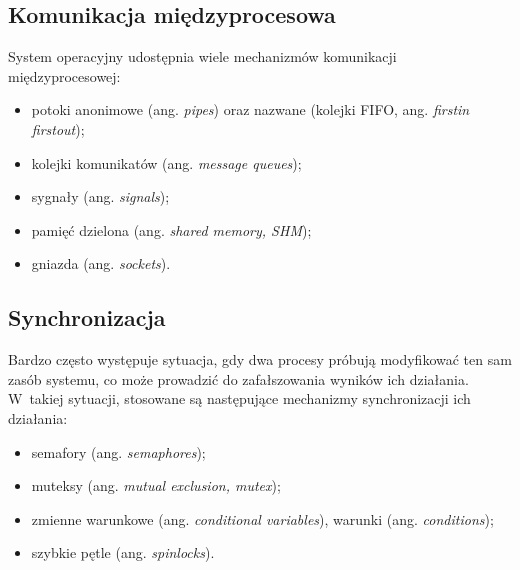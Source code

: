 \documentclass[11pt,makeidx]{mwart}
\begin{document}

\subsection{Komunikacja międzyprocesowa}
%
\indent
	System operacyjny udostępnia wiele mechanizmów komunikacji międzyprocesowej:
	\begin{itemize}
		\item potoki anonimowe (ang. \emph{pipes}) oraz nazwane (kolejki FIFO, ang. \emph{first\dywiz in first\dywiz out});
		\item kolejki komunikatów (ang. \emph{message queues});
		\item sygnały (ang. \emph{signals});
		\item pamięć dzielona (ang. \emph{shared memory, SHM});
		\item gniazda (ang. \emph{sockets}).
	\end{itemize}
\par
%
\subsection{Synchronizacja}
%
\indent
	Bardzo często występuje sytuacja, gdy dwa procesy próbują modyfikować ten sam zasób systemu, co może prowadzić do zafałszowania
	wyników ich działania. W~takiej sytuacji, stosowane są następujące mechanizmy synchronizacji ich działania:
	\begin{itemize}
		\item semafory (ang. \emph{semaphores});
		\item muteksy (ang. \emph{mutual exclusion, mutex});
		\item zmienne warunkowe (ang. \emph{conditional variables}), warunki (ang. \emph{conditions});
		\item szybkie pętle (ang. \emph{spinlocks}).
	\end{itemize}
\par
%
\newpage
\end{document}
